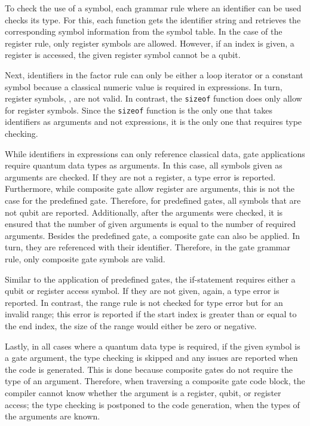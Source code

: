 To check the use of a symbol, each grammar rule where an identifier can be used checks its type. For this, each function gets the identifier string and retrieves the corresponding symbol information from the symbol table. In the case of the register rule, only register symbols are allowed. However, if an index is given, \ie a register is accessed, the given register symbol cannot be a qubit.

Next, identifiers in the factor rule can only be either a loop iterator or a constant symbol because a classical numeric value is required in expressions. In turn, register symbols, \eg, are not valid. In contrast, the \texttt{sizeof} function does only allow for register symbols. Since the \texttt{sizeof} function is the only one that takes identifiers as arguments and not expressions, it is the only one that requires type checking.

While identifiers in expressions can only reference classical data, gate applications require quantum data types as arguments. In this case, all symbols given as arguments are checked. If they are not a register, a type error is reported. Furthermore, while composite gate allow register are arguments, this is not the case for the predefined gate. Therefore, for predefined gates, all symbols that are not qubit are reported. Additionally, after the arguments were checked, it is ensured that the number of given arguments is equal to the number of required arguments. Besides the predefined gate, a composite gate can also be applied. In turn, they are referenced with their identifier. Therefore, in the gate grammar rule, only composite gate symbols are valid.

Similar to the application of predefined gates, the if-statement requires either a qubit or register access symbol. If they are not given, again, a type error is reported. In contrast, the range rule is not checked for type error but for an invalid range; this error is reported if the start index is greater than or equal to the end index, \ie the size of the range would either be zero or negative.

Lastly, in all cases where a quantum data type is required, if the given symbol is a gate argument, the type checking is skipped and any issues are reported when the code is generated. This is done because composite gates do not require the type of an argument. Therefore, when traversing a composite gate code block, the compiler cannot know whether the argument is a register, qubit, or register access; the type checking is postponed to the code generation, when the types of the arguments are known.